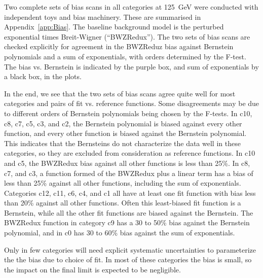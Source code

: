 Two complete sets of bias scans in all categories at 125~GeV were conducted with independent
toys and bias machinery. These are summarised in Appendix~\ref{app:Bias}.
The baseline background model is the perturbed
exponential times Breit-Wigner (``BWZRedux'').  The two sets of bias scans
are checked explicitly for agreement in the BWZReduz bias against Bernstein
polynomials and a sum of exponentials, with orders determined by the F-test.
The bias vs. Bernstein is indicated by the purple box, and sum of exponentials
by a black box, in the plots.

In the end, we see that the two sets of bias scans agree quite well for most
categories and pairs of fit vs. reference functions.  Some disagreements may
be due to different orders of Bernstein polynomials being chosen by the F-tests.
In c10, c8, c7, c5, c3, and c2, the Bernstein polynomial is biased against every
other function, and every other function is biased against the Bernstein polynomial.
This indicates that the Bernsteins do not characterize the data well in these
categories, so they are excluded from consideration as reference functions.
In c10 and c5, the BWZRedux bias against all other functions is less than 25\%.
In c8, c7, and c3, a function formed of the BWZRedux plus a linear term has a
bias of less than 25\% against all other functions, including the sum of exponentials.
Categories c12, c11, c6, c4, and c1 all have at least one fit function with bias
less than 20\% against all other functions.  Often this least-biased fit function
is a Bernstein, while all the other fit functions are biased against the Bernstein.
The BWZRedux function in category c9 has a 30 to 50\% bias against the Bernstein
polynomial, and in c0 has 30 to 60\% bias against the sum of exponentials.

Only in few categories will need explicit systematic uncertainties to parameterize
the the bias due to choice of fit.  In most of these categories the bias is small,
so the impact on the final limit is expected to be negligible.





